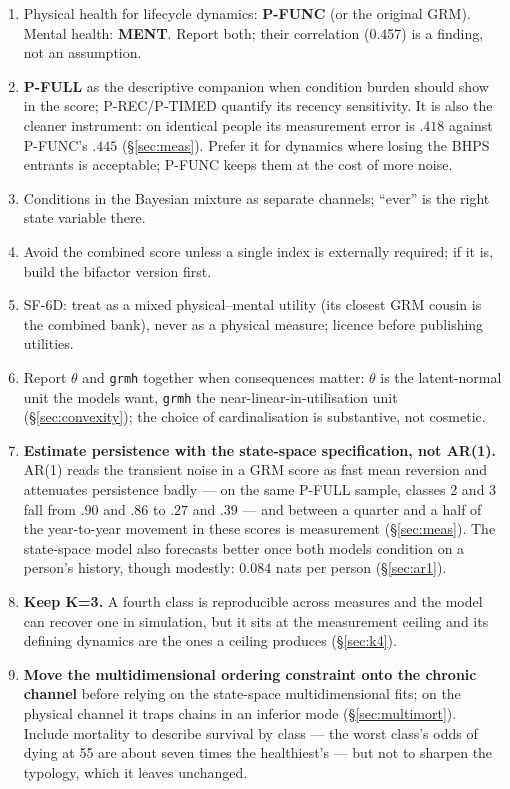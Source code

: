\documentclass[11pt]{article}
\newcommand{\code}[1]{\texttt{\small #1}}
\begin{document}
\begin{enumerate}\itemsep2pt
\item Physical health for lifecycle dynamics: \textbf{P-FUNC} (or the
original GRM). Mental health: \textbf{MENT}. Report both; their correlation
(0.457) is a finding, not an assumption.
\item \textbf{P-FULL} as the descriptive companion when condition burden
should show in the score; P-REC/P-TIMED quantify its recency sensitivity. It
is also the cleaner instrument: on identical people its measurement error is
$.418$ against P-FUNC's $.445$ (\S\ref{sec:meas}). Prefer it for dynamics where
losing the BHPS entrants is acceptable; P-FUNC keeps them at the cost of more
noise.
\item Conditions in the Bayesian mixture as separate channels; ``ever'' is
the right state variable there.
\item Avoid the combined score unless a single index is externally required;
if it is, build the bifactor version first.
\item SF-6D: treat as a mixed physical--mental utility (its closest GRM
cousin is the combined bank), never as a physical measure; licence before
publishing utilities.
\item Report $\theta$ and \code{grmh} together when consequences matter:
$\theta$ is the latent-normal unit the models want, \code{grmh} the
near-linear-in-utilisation unit (\S\ref{sec:convexity}); the choice of
cardinalisation is substantive, not cosmetic.
\item \textbf{Estimate persistence with the state-space specification, not
AR(1).} AR(1) reads the transient noise in a GRM score as fast mean reversion
and attenuates persistence badly --- on the same P-FULL sample, classes 2 and
3 fall from $.90$ and $.86$ to $.27$ and $.39$ --- and between a quarter and
a half of the year-to-year movement in these scores is measurement
(\S\ref{sec:meas}). The state-space model also forecasts better once both
models condition on a person's history, though modestly: $0.084$ nats per
person (\S\ref{sec:ar1}).
\item \textbf{Keep K=3.} A fourth class is reproducible across measures and
the model can recover one in simulation, but it sits at the measurement
ceiling and its defining dynamics are the ones a ceiling produces
(\S\ref{sec:k4}).
\item \textbf{Move the multidimensional ordering constraint onto the chronic
channel} before relying on the state-space multidimensional fits; on the
physical channel it traps chains in an inferior mode (\S\ref{sec:multimort}).
Include mortality to describe survival by class --- the worst class's odds of
dying at 55 are about seven times the healthiest's --- but not to sharpen the
typology, which it leaves unchanged.
\end{enumerate}
\end{document}
